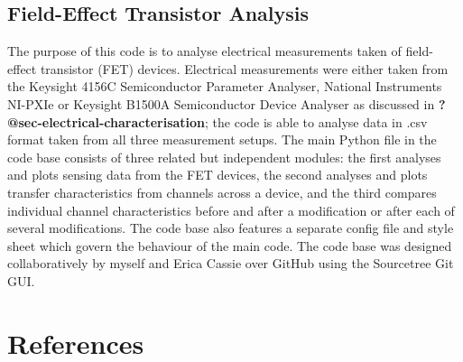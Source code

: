 \documentclass[
  a4paper,
]{scrbook}
\begin{document}
\hypertarget{sec-field-effect-transistor-analysis}{%
\section{Field-Effect Transistor
Analysis}\label{sec-field-effect-transistor-analysis}}

The purpose of this code is to analyse electrical measurements taken of
field-effect transistor (FET) devices. Electrical measurements were
either taken from the Keysight 4156C Semiconductor Parameter Analyser,
National Instruments NI-PXIe or Keysight B1500A Semiconductor Device
Analyser as discussed in \textbf{?@sec-electrical-characterisation}; the
code is able to analyse data in .csv format taken from all three
measurement setups. The main Python file in the code base consists of
three related but independent modules: the first analyses and plots
sensing data from the FET devices, the second analyses and plots
transfer characteristics from channels across a device, and the third
compares individual channel characteristics before and after a
modification or after each of several modifications. The code base also
features a separate config file and style sheet which govern the
behaviour of the main code. The code base was designed collaboratively
by myself and Erica Cassie over GitHub using the Sourcetree Git GUI.

\hypertarget{references}{%
\chapter*{References}\label{references}}



\backmatter
\end{document}

